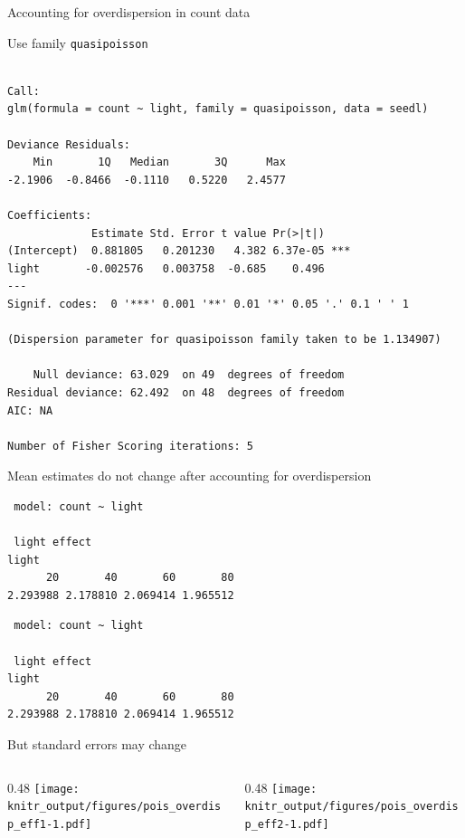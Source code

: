 \documentclass[10pt,ignorenonframetext,]{beamer}
\def\begincols{\begin{columns}[c]}
\def\endcols{\end{columns}}
\def\begincol{\begin{column}{0.48\textwidth}}
\def\endcol{\end{column}}
\begin{document}
\begin{frame}[fragile]{Accounting for overdispersion in count data}

Use family \texttt{quasipoisson}

\begin{verbatim}

Call:
glm(formula = count ~ light, family = quasipoisson, data = seedl)

Deviance Residuals: 
    Min       1Q   Median       3Q      Max  
-2.1906  -0.8466  -0.1110   0.5220   2.4577  

Coefficients:
             Estimate Std. Error t value Pr(>|t|)    
(Intercept)  0.881805   0.201230   4.382 6.37e-05 ***
light       -0.002576   0.003758  -0.685    0.496    
---
Signif. codes:  0 '***' 0.001 '**' 0.01 '*' 0.05 '.' 0.1 ' ' 1

(Dispersion parameter for quasipoisson family taken to be 1.134907)

    Null deviance: 63.029  on 49  degrees of freedom
Residual deviance: 62.492  on 48  degrees of freedom
AIC: NA

Number of Fisher Scoring iterations: 5
\end{verbatim}

\end{frame}

\begin{frame}[fragile]{Mean estimates do not change after accounting for
overdispersion}

\begin{verbatim}
 model: count ~ light

 light effect
light
      20       40       60       80 
2.293988 2.178810 2.069414 1.965512 
\end{verbatim}

\begin{verbatim}
 model: count ~ light

 light effect
light
      20       40       60       80 
2.293988 2.178810 2.069414 1.965512 
\end{verbatim}

\end{frame}

\begin{frame}{But standard errors may change}

\begincols
\begincol
\texttt{[image: knitr\_output/figures/pois\_overdisp\_eff1-1.pdf]} \endcol

\begincol
\texttt{[image: knitr\_output/figures/pois\_overdisp\_eff2-1.pdf]} \endcol
\endcols

\end{frame}
\end{document}
